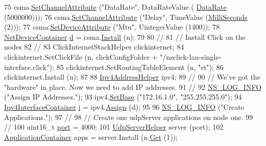 \begin{DoxyCode}
75   csma.\hyperlink{classns3_1_1CsmaHelper_a886d900b2fe44433e0b81752dea7e7f1}{SetChannelAttribute} (\textcolor{stringliteral}{"DataRate"}, DataRateValue (
      \hyperlink{classns3_1_1DataRate}{DataRate} (5000000)));
76   csma.\hyperlink{classns3_1_1CsmaHelper_a886d900b2fe44433e0b81752dea7e7f1}{SetChannelAttribute} (\textcolor{stringliteral}{"Delay"}, TimeValue (\hyperlink{group__timecivil_gaf26127cf4571146b83a92ee18679c7a9}{MilliSeconds} (2)));
77   csma.\hyperlink{classns3_1_1CsmaHelper_a741c31b2526e3570cc62c9d7d9667ca9}{SetDeviceAttribute} (\textcolor{stringliteral}{"Mtu"}, UintegerValue (1400));
78   \hyperlink{classns3_1_1NetDeviceContainer}{NetDeviceContainer} \hyperlink{buildings__pathloss_8m_a9f9b934daed17a4d3613b6886ff4cf4b}{d} = csma.\hyperlink{classns3_1_1CsmaHelper_af79a91372595230b0817200270ab84e7}{Install} (n);
79 
80 \textcolor{comment}{//}
81 \textcolor{comment}{// Install Click on the nodes}
82 \textcolor{comment}{//}
83   ClickInternetStackHelper clickinternet;
84   clickinternet.SetClickFile (n, clickConfigFolder + \textcolor{stringliteral}{"/nsclick-lan-single-interface.click"});
85   clickinternet.SetRoutingTableElement (n, \textcolor{stringliteral}{"rt"});
86   clickinternet.Install (n);
87 
88   \hyperlink{classns3_1_1Ipv4AddressHelper}{Ipv4AddressHelper} ipv4;
89 \textcolor{comment}{//}
90 \textcolor{comment}{// We've got the "hardware" in place.  Now we need to add IP addresses.}
91 \textcolor{comment}{//}
92   \hyperlink{group__logging_gafbd73ee2cf9f26b319f49086d8e860fb}{NS\_LOG\_INFO} (\textcolor{stringliteral}{"Assign IP Addresses."});
93   ipv4.\hyperlink{classns3_1_1Ipv4AddressHelper_acf7b16dd25bac67e00f5e25f90a9a035}{SetBase} (\textcolor{stringliteral}{"172.16.1.0"}, \textcolor{stringliteral}{"255.255.255.0"});
94   \hyperlink{classns3_1_1Ipv4InterfaceContainer}{Ipv4InterfaceContainer} \hyperlink{bernuolliDistribution_8m_a6f6ccfcf58b31cb6412107d9d5281426}{i} = ipv4.\hyperlink{classns3_1_1Ipv4AddressHelper_af8e7f4a1a7e74c00014a1eac445a27af}{Assign} (d);
95 
96   \hyperlink{group__logging_gafbd73ee2cf9f26b319f49086d8e860fb}{NS\_LOG\_INFO} (\textcolor{stringliteral}{"Create Applications."});
97 \textcolor{comment}{//}
98 \textcolor{comment}{// Create one udpServer applications on node one.}
99 \textcolor{comment}{//}
100   uint16\_t \hyperlink{dsdv-manet_8cc_a8e0798404bf2cf5dabb84c5ba9a4f236}{port} = 4000;
101   \hyperlink{classns3_1_1UdpServerHelper}{UdpServerHelper} server (port);
102   \hyperlink{classns3_1_1ApplicationContainer}{ApplicationContainer} apps = server.Install (n.\hyperlink{classns3_1_1NodeContainer_a9ed96e2ecc22e0f5a3d4842eb9bf90bf}{Get} (1));

\end{DoxyCode}
